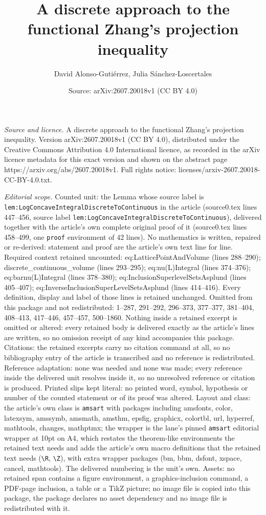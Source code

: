 \documentclass[10pt,a4paper]{amsart}
\title[A discrete approach to the functional Zhang's projection ine]{A discrete approach to the functional Zhang's projection inequality}
\author{David Alonso-Guti\'errez, Julia S\'anchez-Loscertales}
\date{Source: arXiv:2607.20018v1 (CC BY 4.0)}
\begin{document}
\maketitle

\noindent\emph{Source and licence.} A discrete approach to the functional Zhang's projection inequality. Version arXiv:2607.20018v1 (CC BY 4.0), distributed under the Creative Commons Attribution 4.0 International licence, as recorded in the arXiv licence metadata for this exact version and shown on the abstract page https://arxiv.org/abs/2607.20018v1. Full rights notice: licenses/arxiv-2607.20018-CC-BY-4.0.txt.\par\smallskip

\noindent\textit{Editorial scope.} Counted unit: the Lemma whose source label is \texttt{lem:LogConcaveIntegralDiscreteToContinuous} in the article (source0.tex lines 447--456, source label \texttt{lem:LogConcaveIntegralDiscreteToContinuous}), delivered together with the article's own complete original proof of it (source0.tex lines 458--499, one \texttt{proof} environment of 42 lines). No mathematics is written, repaired or re-derived: statement and proof are the article's own text line for line. Required context retained uncounted: eq:LatticePointAndVolume (lines 288--290); discrete\_continuous\_volume (lines 293--295); eq:nu(L)Integral (lines 374--376); eq:barnu(L)Integral (lines 378--380); eq:InclusionSuperlevelSetsAsplund (lines 405--407); eq:InverseInclusionSuperLevelSetsAsplund (lines 414--416). Every definition, display and label of those lines is retained unchanged. Omitted from this package and not redistributed: 1--287, 291--292, 296--373, 377--377, 381--404, 408--413, 417--446, 457--457, 500--1860. Nothing inside a retained excerpt is omitted or altered: every retained body is delivered exactly as the article's lines are written, so no omission receipt of any kind accompanies this package. Citations: the retained excerpts carry no citation command at all, so no bibliography entry of the article is transcribed and no reference is redistributed. Reference adaptation: none was needed and none was made; every reference inside the delivered unit resolves inside it, so no unresolved reference or citation is produced. Printed slips kept literal: no printed word, symbol, hypothesis or number of the counted statement or of its proof was altered. Layout and class: the article's own class is \texttt{amsart} with packages including amsfonts, color, latexsym, amssymb, amsmath, amsthm, epsfig, graphicx, colortbl, url, hyperref, mathtools, changes, mathptmx; the wrapper is the lane's pinned \texttt{amsart} editorial wrapper at 10pt on A4, which restates the theorem-like environments the retained text needs and adds the article's own macro definitions that the retained text needs (\texttt{\textbackslash R}, \texttt{\textbackslash Z}), with extra wrapper packages (bm, bbm, dsfont, xspace, cancel, mathtools). The delivered numbering is the unit's own. Assets: no retained span contains a figure environment, a graphics-inclusion command, a PDF-page inclusion, a table or a TikZ picture; no image file is copied into this package, the package declares no asset dependency and no image file is redistributed with it. 
\end{document}
